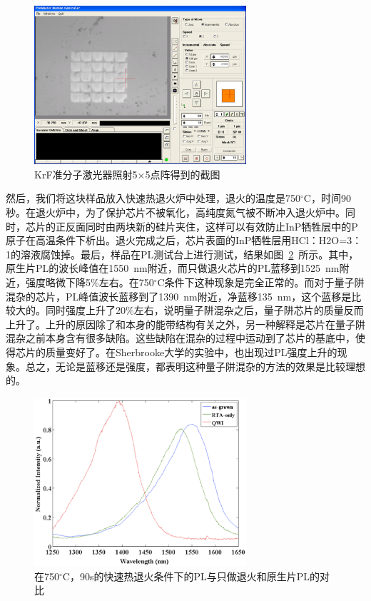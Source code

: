 \documentclass{ZJUthesis}
\begin{document}
\begin{figure}[htbp]
    \centering
    \includegraphics[width=0.7\textwidth]{./Pictures/spots.eps}
    \caption{KrF准分子激光器照射5×5点阵得到的截图}
    \label{fig_spots}
\end{figure}

然后，我们将这块样品放入快速热退火炉中处理，退火的温度是750$^{\circ}$C，时间90秒。在退火炉中，为了保护芯片不被氧化，高纯度氮气被不断冲入退火炉中。同时，芯片的正反面同时由两块新的硅片夹住，这样可以有效防止InP牺牲层中的P原子在高温条件下析出\cite{Pearton1990Reproducible}\cite{Hulko2006The}。退火完成之后，芯片表面的InP牺牲层用HCl：H2O=3：1的溶液腐蚀掉。最后，样品在PL测试台上进行测试，结果如图~\ref{fig_uv_result}~所示。其中，原生片PL的波长峰值在1550~nm附近，而只做退火芯片的PL蓝移到1525~nm附近，强度略微下降5\%左右。在750$^{\circ}$C条件下这种现象是完全正常的。而对于量子阱混杂的芯片，PL峰值波长蓝移到了1390~nm附近，净蓝移135~nm，这个蓝移是比较大的。同时强度上升了20\%左右，说明量子阱混杂之后，量子阱芯片的质量反而上升了。上升的原因除了和本身的能带结构有关之外，另一种解释是芯片在量子阱混杂之前本身含有很多缺陷。这些缺陷在混杂的过程中运动到了芯片的基底中，使得芯片的质量变好了。在Sherbrooke大学的实验中，也出现过PL强度上升的现象\cite{Liu2013Enhanced}。总之，无论是蓝移还是强度，都表明这种量子阱混杂的方法的效果是比较理想的。

\begin{figure}[htbp]
    \centering
    \includegraphics[width=0.7\textwidth]{./Pictures/uv_result.eps}
    \caption{在750$^{\circ}$C，90s的快速热退火条件下的PL与只做退火和原生片PL的对比}
    \label{fig_uv_result}
\end{figure}
\end{document}

